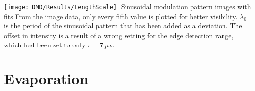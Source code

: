 \noindent\begin{minipage}[c][\textheight][c]{\linewidth}
    \centering
    \texttt{[image: DMD/Results/LengthScale]}
    [Sinusoidal modulation pattern images with fits]{From the image data, only every fifth value is plotted for better visibility. $\lambda_0$ is the period of the sinusoidal pattern that has been added as a deviation. The offset in intensity is a result of a wrong setting for the edge detection range, which had been set to only $r=\SI{7}{px}$.}
    \label{fig:dmd_results_resolution_cuts}
\end{minipage}



\section{Evaporation}
